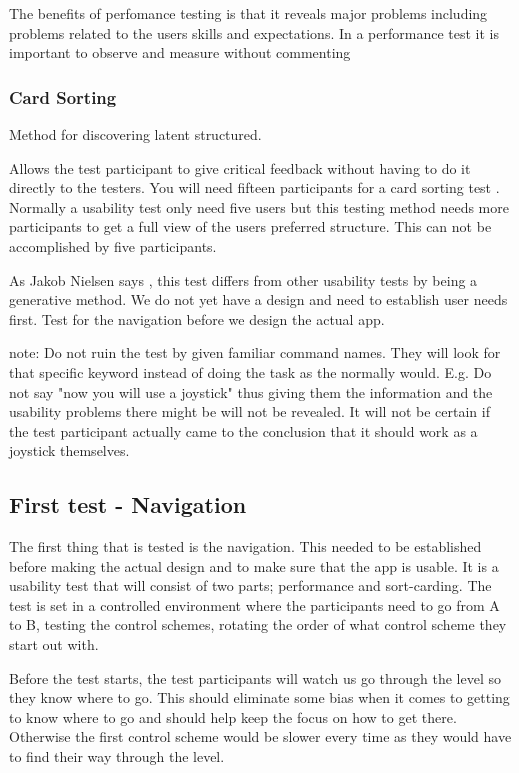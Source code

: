 The benefits of perfomance testing is that it reveals major problems including problems related to the users skills and expectations. \cite{performance}
In a performance test it is important to observe and measure without commenting\cite{performance}


\subsubsection{Card Sorting}
Method for discovering latent structured. \cite{cards}

Allows the test participant to give critical feedback without having to do it directly to the testers. 
You will need fifteen participants for a card sorting test \cite{cardSorting}. Normally a usability test only need five users but this testing method needs more participants to get a full view of the users preferred structure. This can not be accomplished by five participants. \cite{cardSorting}

As Jakob Nielsen says \cite{cardSorting}, this test differs from other usability tests by being a generative method. 
We do not yet have a design and need to establish user needs first. Test for the navigation before we design the actual app. 

note: Do not ruin the test by given familiar command names. They will look for that specific keyword instead of doing the task 
as the normally would. \cite{}
E.g. Do not say "now you will use a joystick" thus giving them the information and the usability problems there might be
will not be revealed. It will not be certain if the test participant actually came to the conclusion that it should work as a joystick
themselves. 

\subsection{First test - Navigation}

The first thing that is tested is the navigation. This needed to be established before making the actual design and to make sure that the app is usable.
It is a usability test that will consist of two parts; performance and sort-carding. 
The test is set in a controlled environment where the participants need to go from A to B, testing the control schemes, rotating the order of what control scheme they start out with.

Before the test starts, the test participants will watch us go through the level so they know where to go. This should eliminate some bias when it comes to getting to know where to go and should help keep the focus on how to get there. Otherwise the first control scheme would be slower every time as they would have to find their way through the level.

